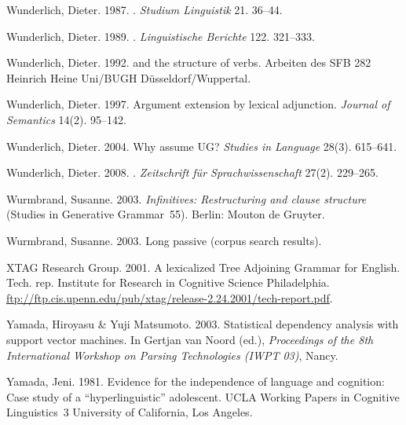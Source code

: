 \begin{thebibliography}{1420}
Wunderlich, Dieter. 1987.
.
\newblock \emph{Studium Linguistik} 21. 36--44.

Wunderlich, Dieter. 1989.
.
\newblock \emph{Linguistische Berichte} 122. 321--333.

Wunderlich, Dieter. 1992.
 and the structure of verbs.
\newblock Arbeiten des SFB 282  Heinrich Heine Uni/BUGH
  D{\"u}sseldorf/Wuppertal.

Wunderlich, Dieter. 1997.
\newblock Argument extension by lexical adjunction.
\newblock \emph{Journal of Semantics} 14(2). 95--142.

Wunderlich, Dieter. 2004.
\newblock Why assume {UG}?
\newblock \emph{Studies in Language} 28(3). 615--641.

Wunderlich, Dieter. 2008.
.
\newblock \emph{Zeitschrift f{\"u}r Sprachwissenschaft} 27(2). 229--265.

Wurmbrand, Susanne. 2003{}.
\newblock \emph{Infinitives: {Restructuring} and clause structure} (Studies in
  Generative Grammar~55).
\newblock Berlin: Mouton de Gruyter.

Wurmbrand, Susanne. 2003{}.
\newblock Long passive (corpus search results).

{XTAG Research Group}. 2001.
\newblock A lexicalized {Tree Adjoining Grammar for English}.
\newblock Tech. rep. Institute for Research in Cognitive Science Philadelphia.
\newblock
  \urlprefix\url{ftp://ftp.cis.upenn.edu/pub/xtag/release-2.24.2001/tech-report.pdf}.

Yamada, Hiroyasu \& Yuji Matsumoto. 2003.
\newblock Statistical dependency analysis with support vector machines.
\newblock In Gertjan van Noord (ed.), \emph{Proceedings of the {8th
  International Workshop on Parsing Technologies (IWPT 03)}}, Nancy.

Yamada, Jeni. 1981.
\newblock Evidence for the independence of language and cognition: Case study
  of a ``hyperlinguistic'' adolescent.
\newblock UCLA Working Papers in Cognitive Linguistics~3 University of
  California, Los Angeles.


\end{thebibliography}
